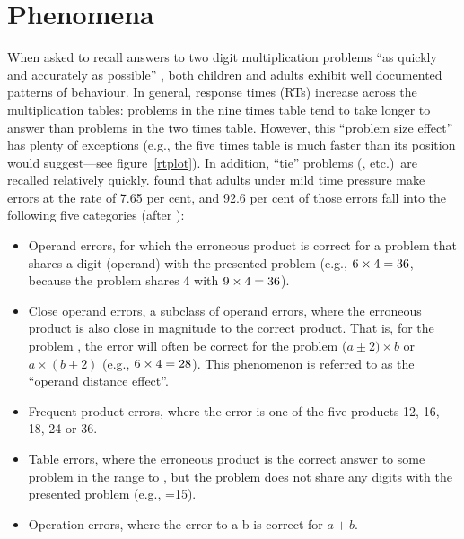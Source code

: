 \section*{Phenomena}

When asked to recall answers to two digit multiplication problems ``as
quickly and accurately as possible'' \cite{camp85}, both children and
adults exhibit well documented patterns of behaviour. In general, response
times (RTs) increase across the multiplication tables: problems in the nine
times table tend to take longer to answer than problems in the two times
table. However, this ``problem size effect'' has plenty of exceptions
(e.g., the five times table is much faster than its position would
suggest---see figure~\ref{rtplot}).  In addition, ``tie'' problems (,
 etc.)\ are recalled relatively quickly.
 found that adults under mild time pressure make errors at
the rate of 7.65 per cent, and 92.6 per cent of those errors fall into the
following five categories (after ):
\begin{itemize}
\item Operand errors, for which the erroneous product is correct for a
problem that shares a digit (operand) with the presented problem
(e.g., $\mbox{$6\times4$}=36$, because the problem shares 4 with $\mbox{$9\times4$}=36$).
\item Close operand errors, a subclass of operand errors, where the
erroneous product is also close in magnitude to the correct product. That
is, for the problem , the error will often be correct for the
problem ($a\pm2) \times b$ or $a \times (b\pm2)$ (e.g., $\mbox{$6\times4$}=28$).  This
phenomenon is referred to as the ``operand distance effect''.
\item Frequent product errors, where the error is
one of the five products 12, 16, 18, 24 or 36.
\item Table errors, where the erroneous product is the correct answer to
some problem in the range  to ,
but the problem does not share any digits with the presented
problem (e.g., =15).
\item Operation errors, where the error to \x a b is correct for $a+b$.
\end{itemize}

\begin{figure}[tbh]\centerline{}\end{figure}


